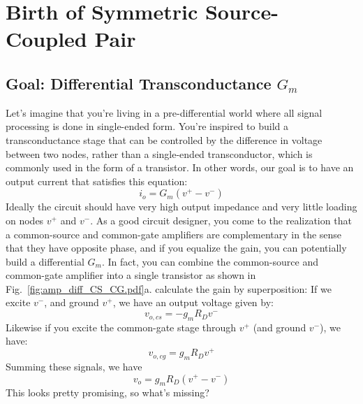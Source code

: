 \section{Birth of Symmetric Source-Coupled Pair}
\subsection{Goal:  Differential Transconductance $G_m$}
Let's imagine that you're living in a pre-differential world where all signal processing is done in single-ended form.  You're inspired to build a transconductance stage that can be controlled by the difference in voltage between two nodes, rather than a single-ended transconductor, which is commonly used in the form of a transistor.   In other words, our goal is to have an output current that satisfies this equation:
\begin{equation}
	i_o = G_m (v^+ - v^-)
\end{equation}
Ideally the circuit should have very high output impedance and very little loading on nodes $v^+$ and $v^-$.  As a good circuit designer, you come to the realization that a common-source and common-gate amplifiers are complementary in the sense that they have opposite phase, and if you equalize the gain, you can potentially build a differential $G_m$.  In fact, you can combine the common-source and common-gate amplifier into a single transistor as shown in Fig.~\ref{fig:amp_diff_CS_CG.pdf}a.  
calculate the gain by superposition:  If we excite $v^-$, and ground $v^+$, we have an output voltage given by:
\begin{equation}
	v_{o,cs} = -g_m R_D v^-
\end{equation} 
Likewise if you excite the common-gate stage through $v^+$ (and ground $v^-$), we have:
\begin{equation}
	v_{o,cg} = g_m R_D  v^+
\end{equation} 
Summing these signals, we have
\begin{equation}
	v_o =   g_m R_D  (v^+ - v^- )
\end{equation}
This looks pretty promising, so what's missing? 
